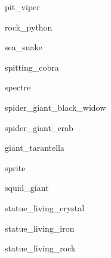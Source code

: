 \documentclass[letterpaper,serif]{module}
\begin{document}
\begin{newmonster}{pit_viper}\end{newmonster}

\begin{newmonster}{rock_python}\end{newmonster}

\begin{newmonster}{sea_snake}\end{newmonster}

\begin{newmonster}{spitting_cobra}\end{newmonster}

\begin{newmonster}{spectre}\end{newmonster}

\begin{newmonster}{spider_giant_black_widow}\end{newmonster}

\begin{newmonster}{spider_giant_crab}\end{newmonster}

\begin{newmonster}{giant_tarantella}\end{newmonster}

\begin{newmonster}{sprite}\end{newmonster}

\begin{newmonster}{squid_giant}\end{newmonster}

\begin{newmonster}{statue_living_crystal}\end{newmonster}

\begin{newmonster}{statue_living_iron}\end{newmonster}

\begin{newmonster}{statue_living_rock}\end{newmonster}
\end{document}
